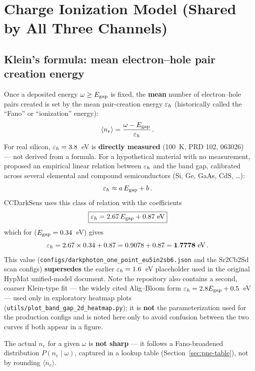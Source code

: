 \section{Charge Ionization Model (Shared by All Three Channels)}
\label{sec:ionization}

\subsection{Klein's formula: mean electron--hole pair creation energy}
\label{sec:klein}

Once a deposited energy $\omega\geq E_\mathrm{gap}$ is fixed, the \textbf{mean} number
of electron--hole pairs created is set by the mean pair-creation energy
$\varepsilon_h$ (historically called the ``Fano'' or ``ionization'' energy):
\begin{equation}
\langle n_e\rangle = \frac{\omega - E_\mathrm{gap}}{\varepsilon_h}\,.
\end{equation}
For real silicon, $\varepsilon_h=3.8$~eV is \textbf{directly measured} (100~K,
PRD 102, 063026) — not derived from a formula. For a hypothetical material
with no measurement, \citet{Klein1968} proposed an empirical linear
relation between $\varepsilon_h$ and the band gap, calibrated across several
elemental and compound semiconductors (Si, Ge, GaAs, CdS, \ldots):
\begin{equation}
\varepsilon_h \approx a\,E_\mathrm{gap} + b\,.
\end{equation}
CCDarkSens uses this class of relation with the coefficients
\begin{equation}
\boxed{\varepsilon_h = 2.67\,E_\mathrm{gap} + 0.87\ \text{eV}}
\end{equation}
which for \SrCdSb{} ($E_\mathrm{gap}=0.34$~eV) gives
\begin{equation}
\varepsilon_h = 2.67\times0.34 + 0.87 = 0.9078 + 0.87 = \mathbf{1.7778}\ \text{eV}\,.
\end{equation}
This value (\texttt{configs/darkphoton\_one\_point\_eu5in2sb6.json} and the
Sr2Cb2Sd scan configs) \textbf{supersedes} the earlier
$\varepsilon_h=1.6$~eV placeholder used in the original HypMat unified-model
document. Note the repository also contains a second, coarser Klein-type
fit — the widely cited Alig--Bloom form $\varepsilon_h = 2.8E_\mathrm{gap}+0.5$~eV — used
only in exploratory heatmap plots
(\texttt{utils/plot\_band\_gap\_2d\_heatmap.py}); it is \textbf{not} the
parameterization used for the production \SrCdSb{} configs and is noted
here only to avoid confusion between the two curves if both appear in a
figure.

The actual $n_e$ for a given $\omega$ is \textbf{not sharp} — it follows a
Fano-broadened distribution $P(n_e\mid\omega)$, captured in a lookup table
(Section~\ref{sec:pne-table}), not by rounding $\langle n_e\rangle$.

